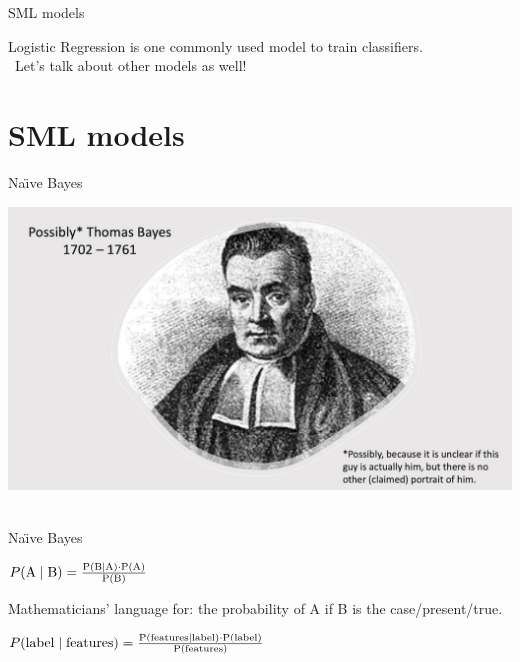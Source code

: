 \documentclass[compress]{beamer}
\begin{document}
\begin{frame}[fragile]{SML models}
	
Logistic Regression is one commonly used model to train classifiers. \\\
Let's talk about other models as well!
	
\end{frame}


\section{SML models}

\begin{frame}{Na\"{\i}ve Bayes}
	
\begin{center}
\includegraphics[width=\linewidth,height=\textheight,keepaspectratio]{../pictures/ThomasBayes.png} \\\
\end{center}
\end{frame}



\begin{frame}{Na\"{\i}ve Bayes}
	
$ P(\rm{A} \mid \rm{B}) = \frac{P(\rm{B} \mid \rm{A}) \cdot P(\rm{A})}{P(\rm{B})} $
	
Mathematicians’ language for: the probability of A if B is the case/present/true. 
	
$ P(\rm{label} \mid \rm{features}) = \frac{P(\rm{features} \mid \rm{label}) \cdot P(\rm{label})}{P(\rm{features})} $

\end{frame}
\end{document}

